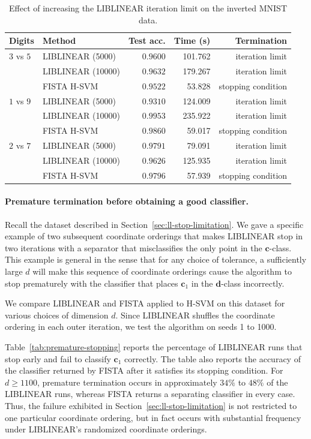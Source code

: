 \documentclass[twoside,11pt]{article}
\renewcommand{\c}{\bm{c}}
\renewcommand{\d}{\bm{d}}
\begin{document}
\begin{table}[t]
\caption{Effect of increasing the LIBLINEAR iteration limit on the inverted MNIST data.}\label{tab:ll-3000-iters}
\centering
\small
\begin{tabular}{llrrr}
\toprule
Digits & Method & Test acc. & Time (s) & Termination\\
\midrule
$3$ vs $5$ & LIBLINEAR (5000)  & $0.9600$ & 101.762 & iteration limit\\
& LIBLINEAR (10000) & $0.9632$ & 179.267 & iteration limit\\
& FISTA H-SVM & $0.9522$ & 53.828 & stopping condition\\
\midrule
$1$ vs $9$ & LIBLINEAR (5000) & $0.9310$ & 124.009 & iteration limit\\
& LIBLINEAR (10000) & $0.9953$ & 235.922 & iteration limit\\
& FISTA H-SVM & $0.9860$ & 59.017 & stopping condition\\
\midrule
$2$ vs $7$ & LIBLINEAR (5000) & $0.9791$ & 79.091 & iteration limit\\
& LIBLINEAR (10000) & $0.9626$ & 125.935 & iteration limit\\
& FISTA H-SVM & $0.9796$ & 57.939 & stopping condition\\
\bottomrule
\end{tabular}
\end{table}

\paragraph{Premature termination before obtaining a good classifier.}
Recall the dataset described in Section~\ref{sec:ll-stop-limitation}. We gave a specific example of two subsequent coordinate orderings that makes LIBLINEAR stop in two iterations with a separator that misclassifies the only point in the $\c$-class. This example is general in the sense that for any choice of tolerance, a sufficiently large $d$ will make this sequence of coordinate orderings cause the algorithm to stop prematurely with the classifier that places $\c_1$ in the $\d$-class incorrectly.

We compare LIBLINEAR and FISTA applied to H-SVM on this dataset for various choices of dimension $d$. Since LIBLINEAR shuffles the coordinate ordering in each outer iteration, we test the algorithm on seeds 1 to 1000.

Table~\ref{tab:premature-stopping} reports the percentage of LIBLINEAR runs that stop early and fail to classify $\c_1$ correctly. The table also reports the accuracy of the classifier returned by FISTA after it satisfies its stopping condition. For $d \geq 1100$, premature termination occurs in approximately $34\%$ to $48\%$ of the LIBLINEAR runs, whereas FISTA returns a separating classifier in every case. Thus, the failure exhibited in Section~\ref{sec:ll-stop-limitation} is not restricted to one particular coordinate ordering, but in fact occurs with substantial frequency under LIBLINEAR's randomized coordinate orderings.
\end{document}
